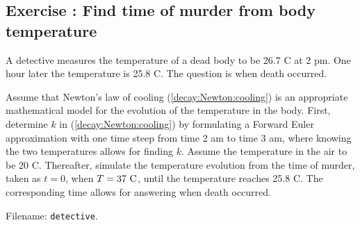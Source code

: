 \documentclass[graybox,sectrefs,envcountresetchap,open=right,final]{svmonodo}
\newenvironment{doconceexercise}{}{}
\newcounter{doconceexercisecounter}
\begin{document}
\begin{doconceexercise}

\subsection*{Exercise \thedoconceexercisecounter: Find time of murder from body temperature}

\label{decay:app:exer:cooling:murder}


A detective measures the temperature of a dead body to be 26.7 C at 2
pm. One hour later the temperature is 25.8 C. The question is when
death occurred.

Assume that Newton's law of cooling (\ref{decay:Newton:cooling}) is an
appropriate mathematical model for the evolution of the temperature in
the body.  First, determine $k$ in (\ref{decay:Newton:cooling}) by
formulating a Forward Euler approximation with one time steep from
time 2 am to time 3 am, where knowing the two temperatures allows for
finding $k$. Assume the temperature in the air to be 20 C. Thereafter,
simulate the temperature evolution from the time of murder, taken as
$t=0$, when $T=37\hbox{ C}$, until the temperature reaches 25.8 C. The
corresponding time allows for answering when death occurred.


\noindent Filename: \texttt{detective}.

\end{doconceexercise}
\end{document}
